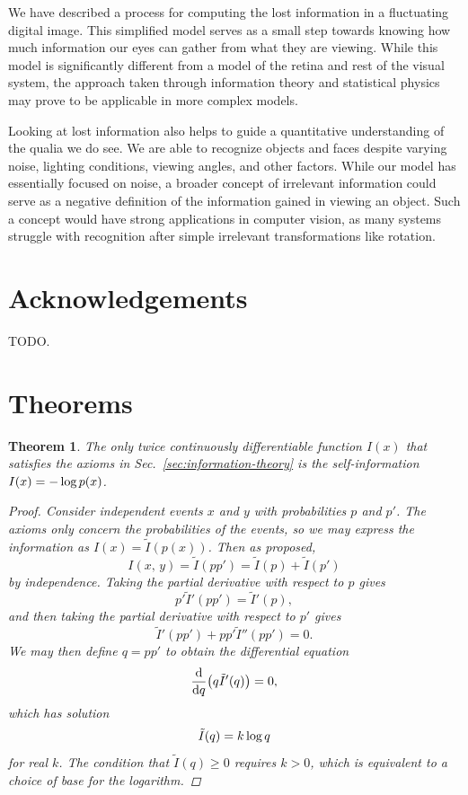 \documentclass[aps,reprint,floatfix]{revtex4-2}
\renewcommand\mathrm\textnormal%
\theoremstyle{plain}
\newtheorem{thm}{Theorem}[section]
\theoremstyle{definition}
\renewcommand\log{\operatorname{\mathrm{log}}}
\begin{document}
We have described a process for computing the lost information in a fluctuating
digital image. This simplified model serves as a small step towards knowing how
much information our eyes can gather from what they are viewing. While this
model is significantly different from a model of the retina and rest of the
visual system, the approach taken through information theory and statistical
physics may prove to be applicable in more complex models.

Looking at lost information also helps to guide a quantitative understanding of
the qualia we do see. We are able to recognize objects and faces despite varying
noise, lighting conditions, viewing angles, and other factors. While our model
has essentially focused on noise, a broader concept of irrelevant information
could serve as a negative definition of the information gained in viewing an
object. Such a concept would have strong applications in computer vision, as
many systems struggle with recognition after simple irrelevant transformations
like rotation.

\section{Acknowledgements}

TODO.

\appendix

\section{Theorems}

\begin{thm}\label{thm:self-information}
  The only twice continuously differentiable function $I(x)$ that satisfies the
  axioms in Sec.~\ref{sec:information-theory} is the self-information $I(x) =
  -\log p(x)$.
  \begin{proof}
    Consider independent events $x$ and $y$ with probabilities $p$ and $p'$. The
    axioms only concern the probabilities of the events, so we may express the
    information as $I(x) = \tilde{I}(p(x))$. Then as proposed,
    \[
      I(x,\, y)
      = \tilde{I}(pp')
      = \tilde{I}(p) + \tilde{I}(p')
    \]
    by independence. Taking the partial derivative with respect to $p$ gives
    \[
      p' \tilde{I}'(pp')
      = \tilde{I}'(p),
    \]
    and then taking the partial derivative with respect to $p'$ gives
    \[
      \tilde{I}'(pp') + pp' \tilde{I}''(pp')
      = 0.
    \]
    We may then define $q = pp'$ to obtain the differential equation
    \[
      \dv{q}\qty(q \tilde{I}'(q))
      = 0,
    \]
    which has solution
    \[
      \tilde{I}(q) = k\log q
    \]
    for real $k$. The condition that $\tilde{I}(q) \ge 0$ requires $k > 0$,
    which is equivalent to a choice of base for the logarithm.
  \end{proof}
\end{thm}
\end{document}
